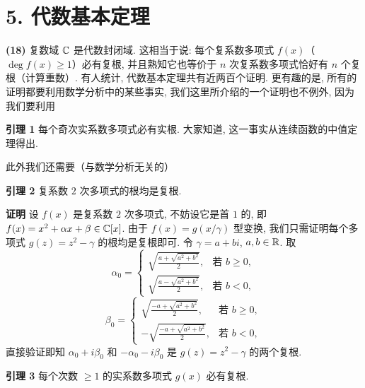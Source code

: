 \section*{5. 代数基本定理}

\textbf{(18)} 复数域 $\mathbb{C}$ 是代数封闭域. 这相当于说: 每个复系数多项式 $f(x)$（$\deg f(x)\geqslant 1$）必有复根, 并且熟知它也等价于 $n$ 次复系数多项式恰好有 $n$ 个复根（计算重数）. 有人统计, 代数基本定理共有近两百个证明. 更有趣的是, 所有的证明都要利用数学分析中的某些事实, 我们这里所介绍的一个证明也不例外, 因为我们要利用

\textbf{引理 1} 每个奇次实系数多项式必有实根. 大家知道, 这一事实从连续函数的中值定理得出.

此外我们还需要（与数学分析无关的）

\textbf{引理 2} 复系数 $2$ 次多项式的根均是复根.

\textbf{证明} 设 $f(x)$ 是复系数 $2$ 次多项式, 不妨设它是首 $1$ 的, 即 $f(x)=x^2+\alpha x+\beta\in\mathbb{C}[x]$. 由于 $f(x)=g(x/\gamma)$ 型变换, 我们只需证明每个多项式 $g(z)=z^2-\gamma$ 的根均是复根即可. 令 $\gamma=a+bi$, $a,b\in\mathbb{R}$. 取
\[
  \alpha_0=\begin{cases}
    \sqrt{\frac{a+\sqrt{a^2+b^2}}{2}}, & \text{若 } b\geqslant 0,\\
    \sqrt{\frac{a-\sqrt{a^2+b^2}}{2}}, & \text{若 } b<0,
  \end{cases}
\]
\[
  \beta_0=\begin{cases}
    \sqrt{\frac{-a+\sqrt{a^2+b^2}}{2}}, & \text{若 } b\geqslant 0,\\
    -\sqrt{\frac{-a+\sqrt{a^2+b^2}}{2}}, & \text{若 } b<0,
  \end{cases}
\]
直接验证即知 $\alpha_0+i\beta_0$ 和 $-\alpha_0-i\beta_0$ 是 $g(z)=z^2-\gamma$ 的两个复根.

\textbf{引理 3} 每个次数 $\geqslant 1$ 的实系数多项式 $g(x)$ 必有复根.

